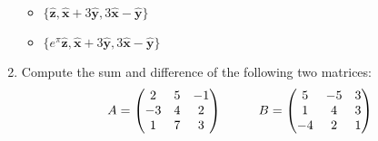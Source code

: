 \documentclass{article}
\begin{document}
\begin{enumerate}
\begin{itemize}
\item $\{ \mathbf{\hat{z}}, \mathbf{\hat{x}}+3\mathbf{\hat{y}}, 3\mathbf{\hat{x}}-\mathbf{\hat{y}}\}$

\item $\{ e^\pi \mathbf{\hat{z}}, \mathbf{\hat{x}}+3\mathbf{\hat{y}}, 3\mathbf{\hat{x}}-\mathbf{\hat{y}}\}$
\end{itemize}


\item  Compute the sum and difference of the following two matrices:
$$A=\begin{pmatrix}
2 & 5 & -1 \\
-3 & 4 & 2 \\
1 & 7 & 3
\end{pmatrix} \hskip 1truecm B=\begin{pmatrix}
5 & -5 & 3 \\
1 & 4 & 3 \\
-4 & 2 & 1
\end{pmatrix}$$ 



\end{enumerate}
\end{document}
